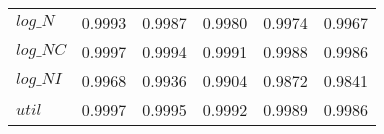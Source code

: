 \begin{center}
\begin{longtable}{lccccc}
$log\_N          $	 & 	     0.9993	 & 	     0.9987	 & 	     0.9980	 & 	     0.9974	 & 	     0.9967 \\ 
$log\_NC         $	 & 	     0.9997	 & 	     0.9994	 & 	     0.9991	 & 	     0.9988	 & 	     0.9986 \\ 
$log\_NI         $	 & 	     0.9968	 & 	     0.9936	 & 	     0.9904	 & 	     0.9872	 & 	     0.9841 \\ 
${util}          $	 & 	     0.9997	 & 	     0.9995	 & 	     0.9992	 & 	     0.9989	 & 	     0.9986 \\ 
\end{longtable}
 \end{center}
